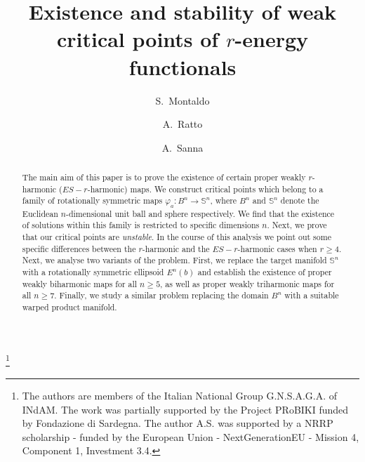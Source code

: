 \documentclass[11pt]{amsart}
\theoremstyle{plain}
\theoremstyle{definition}
\numberwithin{equation}{section}
\def \s{{\mathbb S}}
\numberwithin{equation}{section}
\begin{document}
\title[Existence and stability of weak critical points]{Existence and stability of weak critical points of $r$-energy functionals}


\author{S.~Montaldo}
\address{Universit\`a degli Studi di Cagliari\\
Dipartimento di Matematica e Informatica\\
Via Ospedale 72\\
09124 Cagliari, Italia}

\author{A.~Ratto}
\address{Universit\`a degli Studi di Cagliari\\
Dipartimento di Matematica e Informatica\\
Via Ospedale 72\\
09124 Cagliari, Italia}

\author{A.~Sanna}
\address{Universit\`a degli Studi di Cagliari\\
Dipartimento di Matematica e Informatica\\
Via Ospedale 72\\
09124 Cagliari, Italia}


\begin{abstract}
The main aim of this paper is to prove the existence of certain proper weakly $r$-harmonic ($ES-r$-harmonic) maps. We construct critical points which belong to a family of rotationally symmetric maps $\varphi_a : B^n \to \s^n$, where $B^n$ and $\s^n$ denote the Euclidean $n$-dimensional unit ball and sphere respectively. We find that the existence of solutions within this family is restricted to specific dimensions $n$.  Next, we prove that our critical points are \textit{unstable}. In the course of this analysis we point out some specific differences between the $r$-harmonic and the $ES-r$-harmonic cases when $r \geq 4$. Next, we analyse two variants of the problem. First, we replace the target manifold $\s^n$ with a rotationally symmetric ellipsoid $E^n(b)$ and establish the existence of proper weakly biharmonic maps for all $n \geq 5$, as well as proper weakly triharmonic maps for all $n \geq 7$. Finally, we study a similar problem replacing the domain $B^n$ with a suitable warped product manifold.
\end{abstract}



\thanks{The authors are members of the Italian National Group G.N.S.A.G.A. of INdAM. The work was partially supported by the Project {PRoBIKI} funded by Fondazione di Sardegna.  The author A.S. was supported by a NRRP scholarship - funded by the European Union - NextGenerationEU - Mission 4, Component 1, 
Investment 3.4.}
\end{document}
